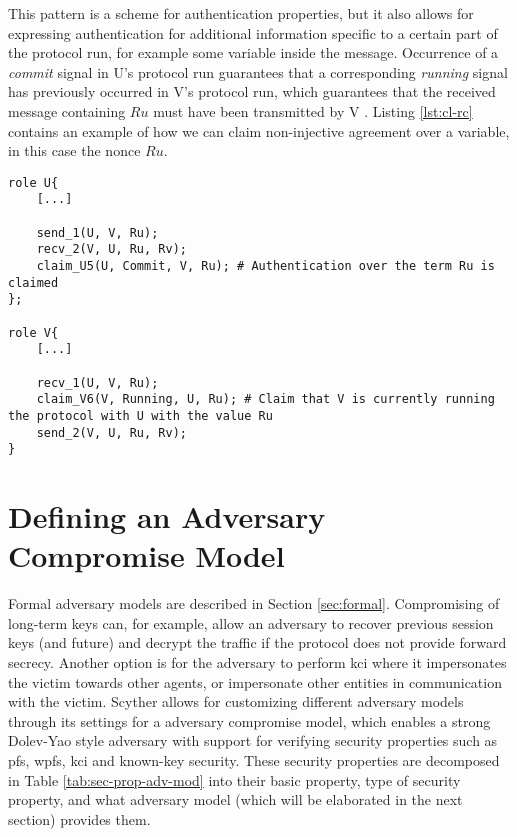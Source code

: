 This pattern is a scheme for authentication properties, but it also allows for expressing authentication for additional information specific to a certain part of the protocol run, for example some variable inside the message. Occurrence of a \emph{commit} signal in U's protocol run guarantees that a corresponding \emph{running} signal has previously occurred in V's protocol run, which guarantees that the received message containing $Ru$ must have been transmitted by V \cite{ryan2001modelling}. Listing \ref{lst:cl-rc} contains an example of how we can claim non-injective agreement over a variable, in this case the nonce $Ru$. 
\newline
\newpage
\begin{lstlisting}[caption={Example of a running, commit claim in Scyther to provide authentication for a set of terms.}, label={lst:cl-rc}]
role U{
	[...]
	
	send_1(U, V, Ru);
	recv_2(V, U, Ru, Rv);
	claim_U5(U, Commit, V, Ru); # Authentication over the term Ru is claimed
};

role V{
	[...]
	
	recv_1(U, V, Ru);
	claim_V6(V, Running, U, Ru); # Claim that V is currently running the protocol with U with the value Ru
	send_2(V, U, Ru, Rv); 
}
\end{lstlisting}

\section{Defining an Adversary Compromise Model}


Formal adversary models are described in Section \ref{sec:formal}. Compromising of long-term keys can, for example, allow an adversary to recover previous session keys (and future) and decrypt the traffic if the protocol does not provide forward secrecy. Another option is for the adversary to perform \gls{kci} where it impersonates the victim towards other agents, or impersonate other entities in communication with the victim. Scyther allows for customizing different adversary models through its settings for a adversary compromise model, which enables a strong Dolev-Yao style adversary with support for verifying security properties such as \gls{pfs}, \gls{wpfs}, \gls{kci} and known-key security. These security properties are decomposed in Table \ref{tab:sec-prop-adv-mod} into their basic property, type of security property, and what adversary model (which will be elaborated in the next section) provides them.

